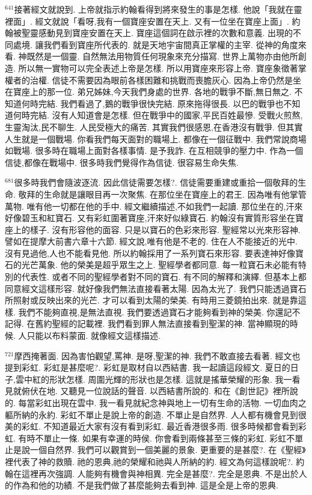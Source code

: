 \documentclass{book}
\begin{document}
$^{641}$接著經文就說到.
上帝就指示約翰看得到將來發生的事是怎樣.
他說「我就在靈裡面」.
經文就說「看呀,我有一個寶座安置在天上.
又有一位坐在寶座上面」.
約翰被聖靈感動見到寶座安置在天上.
寶座這個詞在啟示裡的次數和意義.
出現的不同處境.
讓我們看到寶座所代表的.
就是天地宇宙間真正掌權的主宰.
從神的角度來看.
神既然是一個靈.
自然無法用物質任何現象來充分描寫.
世界上萬物亦由他所創造.
所以無一實物可以完全表述上帝是怎樣.
所以用寶座來形容上帝.
寶座象徵著掌權者的治權.
信徒不需要因為眼前各樣困難和挑戰而喪膽灰心.
因為上帝仍然是坐在寶座上的那一位.
弟兄姊妹,今天我們身處的世界.
各地的戰爭不斷,無日無之.
不知道何時完結.
我們看過了,鵝的戰爭很快完結.
原來拖得很長.
以巴的戰爭也不知道何時完結.
沒有人知道會是怎樣.
但在戰爭中的國家,平民百姓最慘.
受戰火煎熬,生靈淘汰,民不聊生.
人民受極大的痛苦.
其實我們很感恩,在香港沒有戰爭.
但其實人生就是一個戰場.
你看我們每天面對的職場上.
都像在一個征戰中.
我們常說商場如戰場.
很多時在職場上面對各樣事情.
是予我詐.
在互相競爭的壓力中.
作為一個信徒,都像在戰場中.
很多時我們覺得作為信徒.
很容易生命失焦.

$^{681}$很多時我們會隨波逐流.
因此信徒需要怎樣?.
信徒需要重建或重拾一個敬拜的生命.
敬拜的生命就是讓眼目再一次聚焦.
在那位坐在寶座上的君王.
因為唯有他掌管萬物.
唯有他一切都在他的手中.
經文繼續描述,不如我們一起讀.
那位坐在的,汗來好像碧玉和紅寶石.
又有彩虹圍著寶座,汗來好似綠寶石.
約翰沒有實質形容坐在寶座上的樣子.
沒有形容他的面容.
只是以寶石的色彩來形容.
聖經常以光來形容神.
譬如在提摩大前書六章十六節.
經文說,唯有他是不老的.
住在人不能接近的光中.
沒有見過他,人也不能看見他.
所以約翰採用了一系列寶石來形容.
要表達神好像寶石的光芒萬象.
他的榮美是超乎眾生之上.
聖經學者都同意.
每一粒寶石未必能有特別的代表性.
或者不同的聖經學者對不同的寶石.
有不同的解釋和演繹.
但基本上都同意經文這樣形容.
就好像我們無法直接看著太陽.
因為太光了.
我們只能透過寶石所照射或反映出來的光芒.
才可以看到太陽的榮美.
有時用三菱鏡拍出來.
就是靠這樣.
我們不能夠直視,是無法直視.
我們要透過寶石才能夠看到神的榮美.
你還記不記得.
在舊約聖經的記載裡.
我們看到罪人無法直接看到聖潔的神.
當神顯現的時候.
人只能以布料蒙面.
就像經文這樣描述.

$^{721}$摩西掩著面.
因為害怕觀望,罵神.
是呀,聖潔的神.
我們不敢直接去看著.
經文也提到彩虹.
彩虹是甚麼呢?.
彩虹是取材自以西結書.
我一起讀這段經文.
夏日的日子,雲中紅的形狀怎樣.
周圍光輝的形狀也是怎樣.
這就是搖華榮耀的形象.
我一看見就俯伏在地.
又聽見一位說話的聲音.
以西結書所說的.
和在《創世記》裡所說的.
每當彩虹出現在雲中.
我一看見就紀念神與地上一切有生命的活物.
一切血肉之軀所納的永約.
彩虹不單止是說上帝的創造.
不單止是自然界.
人人都有機會見到很美的彩虹.
不知道最近大家有沒有看到彩虹.
最近香港很多雨.
很多時候都會看到彩虹.
有時不單止一條.
如果有幸運的時侯.
你會看到兩條甚至三條的彩虹.
彩虹不單止是說一個自然界.
我們可以觀賞到一個美麗的景象.
更重要的是甚麼?.
在《聖經》裡代表了神的救贖.
祂的恩典,祂的榮耀和祂與人所納的約.
經文為何這樣說呢?.
約翰在這裡再次強調.
人能夠有機會與神相異.
完全是甚麼?.
完全是恩典.
不是出於人的作為和他的功績.
不是我們做了甚麼能夠去看到神.
這是全是上帝的恩典.
\end{document}
